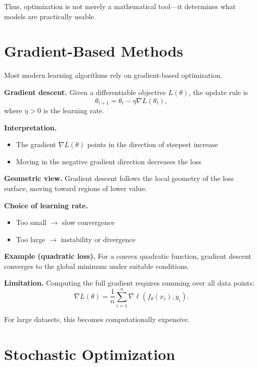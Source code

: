 Thus, optimization is not merely a mathematical tool—it determines what models are practically usable.

\section{Gradient-Based Methods}

Most modern learning algorithms rely on gradient-based optimization.

\medskip

\noindent
\textbf{Gradient descent.}  
Given a differentiable objective $L(\theta)$, the update rule is
\[
\theta_{t+1} = \theta_t - \eta \nabla L(\theta_t),
\]
where $\eta > 0$ is the learning rate.

\medskip

\noindent
\textbf{Interpretation.}
\begin{itemize}
    \item The gradient $\nabla L(\theta)$ points in the direction of steepest increase
    \item Moving in the negative gradient direction decreases the loss
\end{itemize}

\medskip

\noindent
\textbf{Geometric view.}  
Gradient descent follows the local geometry of the loss surface, moving toward regions of lower value.

\medskip

\noindent
\textbf{Choice of learning rate.}
\begin{itemize}
    \item Too small $\rightarrow$ slow convergence
    \item Too large $\rightarrow$ instability or divergence
\end{itemize}

\medskip

\noindent
\textbf{Example (quadratic loss).}  
For a convex quadratic function, gradient descent converges to the global minimum under suitable conditions.

\medskip

\noindent
\textbf{Limitation.}  
Computing the full gradient requires summing over all data points:
\[
\nabla L(\theta) = \frac{1}{n} \sum_{i=1}^n \nabla \ell(f_\theta(x_i), y_i).
\]

For large datasets, this becomes computationally expensive.

\section{Stochastic Optimization}

